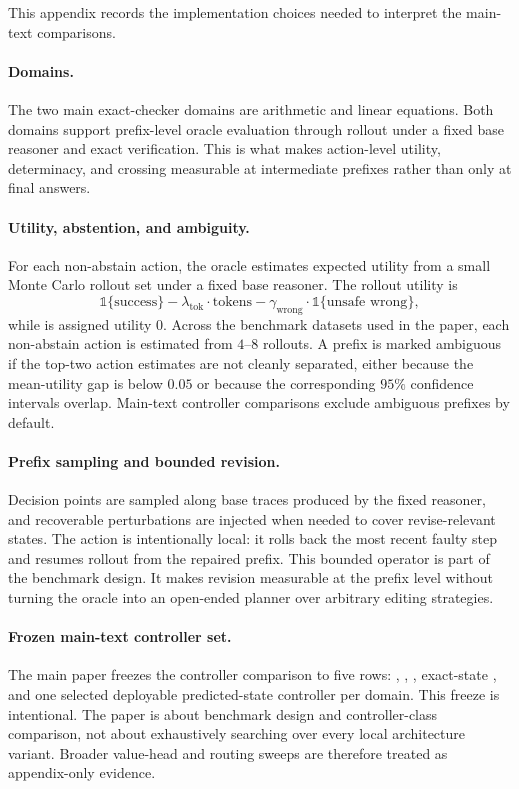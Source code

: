 This appendix records the implementation choices needed to interpret the main-text comparisons.

\paragraph{Domains.}
The two main exact-checker domains are arithmetic and linear equations.
Both domains support prefix-level oracle evaluation through rollout under a fixed base reasoner and exact verification.
This is what makes action-level utility, determinacy, and crossing measurable at intermediate prefixes rather than only at final answers.

\paragraph{Utility, abstention, and ambiguity.}
For each non-abstain action, the oracle estimates expected utility from a small Monte Carlo rollout set under a fixed base reasoner.
The rollout utility is
\[
\mathbb{1}\{\text{success}\} - \lambda_{\text{tok}} \cdot \text{tokens} - \gamma_{\text{wrong}} \cdot \mathbb{1}\{\text{unsafe wrong}\},
\]
while \abstain is assigned utility \(0\).
Across the benchmark datasets used in the paper, each non-abstain action is estimated from \(4\)--\(8\) rollouts.
A prefix is marked ambiguous if the top-two action estimates are not cleanly separated, either because the mean-utility gap is below \(0.05\) or because the corresponding \(95\%\) confidence intervals overlap.
Main-text controller comparisons exclude ambiguous prefixes by default.

\paragraph{Prefix sampling and bounded revision.}
Decision points are sampled along base traces produced by the fixed reasoner, and recoverable perturbations are injected when needed to cover revise-relevant states.
The \revise action is intentionally local: it rolls back the most recent faulty step and resumes rollout from the repaired prefix.
This bounded operator is part of the benchmark design.
It makes revision measurable at the prefix level without turning the oracle into an open-ended planner over arbitrary editing strategies.

\paragraph{Frozen main-text controller set.}
The main paper freezes the controller comparison to five rows:
\orderedscalar, \learnedoned, \directpolicy, exact-state \triver, and one selected deployable predicted-state \triver controller per domain.
This freeze is intentional.
The paper is about benchmark design and controller-class comparison, not about exhaustively searching over every local architecture variant.
Broader value-head and routing sweeps are therefore treated as appendix-only evidence.

